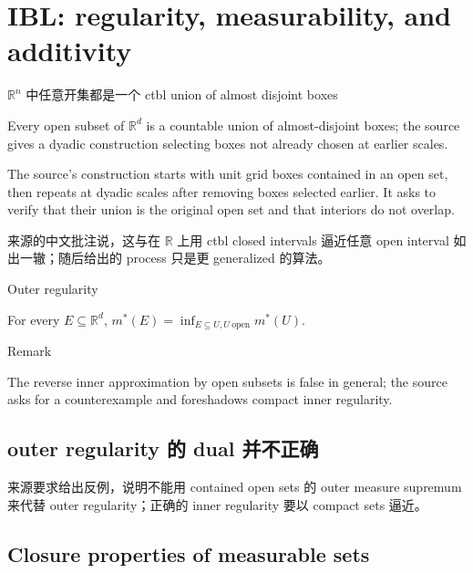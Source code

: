 \chapter{IBL: regularity, measurability, and additivity}

\begin{theorem}{\(\mathbb{R}^{n}\) 中任意开集都是一个 ctbl union of almost disjoint
boxes}

Every open subset of \(\mathbb{R}^{d}\) is a countable union of almost-disjoint boxes; the source gives a dyadic construction selecting boxes not already chosen at earlier scales.

\end{theorem}

The source's construction starts with unit grid boxes contained in an open set, then repeats at dyadic scales after removing boxes selected earlier. It asks to verify that their union is the original open set and that interiors do not overlap.

来源的中文批注说，这与在 \(\mathbb{R}\) 上用 ctbl closed intervals 逼近任意 open interval 如出一辙；随后给出的 process 只是更 generalized 的算法。

\begin{theorem}{Outer regularity}

For every \(E \subseteq \mathbb{R}^{d}\), \(m^{\ast}(E) = \inf_{E \subseteq U,U\ \text{open}}m^{\ast}(U)\).

\end{theorem}

\begin{qlremark}{Remark}

The reverse inner approximation by open subsets is false in general; the source asks for a counterexample and foreshadows compact inner regularity.

\end{qlremark}

\section{outer regularity 的 dual 并不正确}

来源要求给出反例，说明不能用 contained open sets 的 outer measure supremum 来代替 outer regularity；正确的 inner regularity 要以 compact sets 逼近。

\section{Closure properties of measurable sets}


